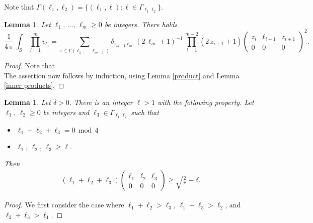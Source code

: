 \documentclass[11pt]{amsart}
\newtheorem{lemma}[theorem]{Lemma}
\theoremstyle {definition}
\begin{document}
\begin{appendices}
Note that $\Gamma(\ell_1,\ell_2)=\{(\ell_1,\ell):\ell\in \Gamma_{\ell_1\ell_2}\}$.
\begin{lemma} \label{m product}
	Let $\ell_1,\,\ldots,\,\ell_{m}\geq0$ be  integers.  There holds 
	$$
	\frac{1}{4\,\pi}\,\int_S\,\prod_{i=1}^m v_{\ell_i}=\sum_{ z\in\Gamma(\ell_1,\ldots,\ell_{m-1})}\delta_{z_{m-1}\ell_m}\,(2\,\ell_m+1)^{-1}\,\prod_{i=1}^{m-2}(2\,z_{i+1}+1)\begin{pmatrix} z_{i} & \ell_{i+1} & z_{i+1} \\
		0& 0 & 0
	\end{pmatrix}^2.
	$$
	
\end{lemma} 
\begin{proof}
	Note that 
	$$
	$$
	The assertion now follows by induction, using Lemma \ref{product} and Lemma \ref{inner products}.
\end{proof}

\begin{lemma}  \label{3j lower bound} Let $\delta>0$. There is an integer $\ell>1$ with the following property. Let $\ell_1,\,\ell_2\geq0$ be integers and $\ell_3\in \Gamma_{\ell_1\ell_2}$ such that
	\begin{itemize}
		\item[$\circ$] $\ell_1+\ell_2+\ell_3=0\, \operatorname{mod}\, 4$ 
		\item[$\circ$] $\ell_1,\,\ell_2,\,\ell_3\geq \ell.$
	\end{itemize}
	Then 
	\begin{align*} 
		(\ell_1+\ell_2+\ell_3)\begin{pmatrix} \ell_1 & \ell_2 &\ell_3 \\
			0& 0 & 0
		\end{pmatrix}\geq \sqrt{\frac{2}{\pi}}-\delta.
	\end{align*} 
\end{lemma} 
\begin{proof}
	We first consider the case where $\ell_1+\ell_2>\ell_3$, $\ell_1+\ell_3>\ell_2$, and $\ell_2+\ell_3>\ell_1$.
	

\end{proof}
\end{appendices}
\end{document}
